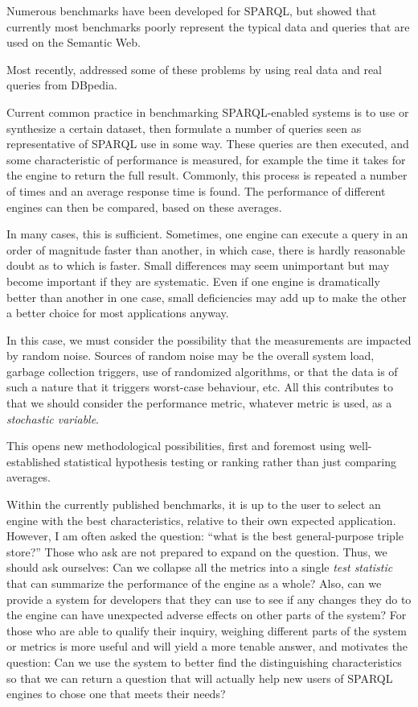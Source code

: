 \documentclass{llncs}
\begin{document}
Numerous benchmarks have been developed for SPARQL, but
\cite{Duan:2011:AOC:1989323.1989340} showed that currently most
benchmarks poorly represent the typical data and queries that are used
on the Semantic Web.

Most recently, \cite{mxro:Morsey2011DBpedia} addressed some of these
problems by using real data and real queries from DBpedia.

Current common practice in benchmarking SPARQL-enabled systems is to
use or synthesize a certain dataset, then formulate a number of
queries seen as representative of SPARQL use in some way. These
queries are then executed, and some characteristic of performance is
measured, for example the time it takes for the engine to return the
full result. Commonly, this process is repeated a number of times and
an average response time is found. The performance of different
engines can then be compared, based on these averages.

In many cases, this is sufficient. Sometimes, one engine can execute a
query in an order of magnitude faster than another, in which case, there
is hardly reasonable doubt as to which is faster. Small differences may seem
unimportant but may become important if they are systematic. Even if
one engine is dramatically better than another in one case, small
deficiencies may add up to make the other a better choice for most
applications anyway.

In this case, we must consider the possibility that the measurements
are impacted by random noise. Sources of random noise may be the
overall system load, garbage collection triggers, use of randomized
algorithms, or that the data is of such a nature that it triggers
worst-case behaviour, etc. All this contributes to that we should
consider the performance metric, whatever metric is used, as a
\emph{stochastic variable}.

This opens new methodological possibilities, first and foremost
using well-established statistical hypothesis testing or ranking
rather than just comparing averages.

Within the currently published benchmarks, it is up to the user to
select an engine with the best characteristics, relative to their own
expected application. However, I am often asked the question: ``what
is the best general-purpose triple store?'' Those who ask are not
prepared to expand on the question. Thus, we should ask ourselves: 
Can we collapse all the metrics into a single \emph{test
  statistic} that can summarize the performance of the engine as a
whole? Also, can we provide a system for developers that they can use
to see if any changes they do to the engine can have unexpected adverse
effects on other parts of the system? For those who are able to
qualify their inquiry, weighing different parts of the system or
metrics is more useful and will yield a more tenable answer, and
motivates the question: Can we use the system to better find the
distinguishing characteristics so that we can return a question that
will actually help new users of SPARQL engines to chose one that meets
their needs?
\end{document}
